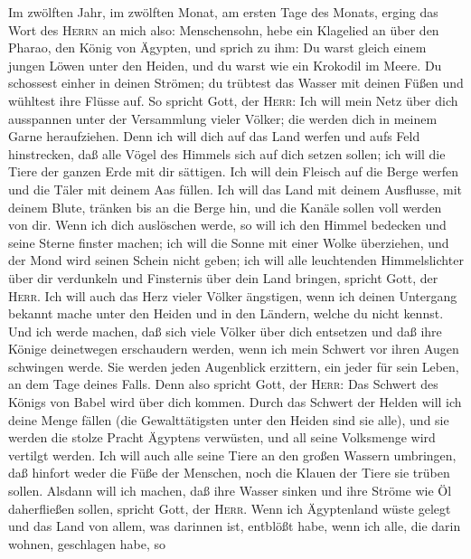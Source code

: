  Im zwölften Jahr, im zwölften Monat, am ersten Tage des
Monats, erging das Wort des \textsc{Herrn} an mich also: 
Menschensohn, hebe ein Klagelied an über den Pharao, den König von
Ägypten, und sprich zu ihm: Du warst gleich einem jungen Löwen unter den
Heiden, und du warst wie ein Krokodil im Meere. Du schossest einher in
deinen Strömen; du trübtest das Wasser mit deinen Füßen und wühltest
ihre Flüsse auf.  So spricht Gott, der \textsc{Herr}: Ich
will mein Netz über dich ausspannen unter der Versammlung vieler Völker;
die werden dich in meinem Garne heraufziehen.  Denn ich
will dich auf das Land werfen und aufs Feld hinstrecken, daß alle Vögel
des Himmels sich auf dich setzen sollen; ich will die Tiere der ganzen
Erde mit dir sättigen.  Ich will dein Fleisch auf die
Berge werfen und die Täler mit deinem Aas füllen.  Ich
will das Land mit deinem Ausflusse, mit deinem Blute, tränken bis an die
Berge hin, und die Kanäle sollen voll werden von dir. 
Wenn ich dich auslöschen werde, so will ich den Himmel bedecken und
seine Sterne finster machen; ich will die Sonne mit einer Wolke
überziehen, und der Mond wird seinen Schein nicht geben; 
ich will alle leuchtenden Himmelslichter über dir verdunkeln und
Finsternis über dein Land bringen, spricht Gott, der \textsc{Herr}.
 Ich will auch das Herz vieler Völker ängstigen, wenn ich
deinen Untergang bekannt mache unter den Heiden und in den Ländern,
welche du nicht kennst.  Und ich werde machen, daß sich
viele Völker über dich entsetzen und daß ihre Könige deinetwegen
erschaudern werden, wenn ich mein Schwert vor ihren Augen schwingen
werde. Sie werden jeden Augenblick erzittern, ein jeder für sein Leben,
an dem Tage deines Falls.  Denn also spricht Gott, der
\textsc{Herr}: Das Schwert des Königs von Babel wird über dich kommen.
 Durch das Schwert der Helden will ich deine Menge fällen
(die Gewalttätigsten unter den Heiden sind sie alle), und sie werden die
stolze Pracht Ägyptens verwüsten, und all seine Volksmenge wird vertilgt
werden.  Ich will auch alle seine Tiere an den großen
Wassern umbringen, daß hinfort weder die Füße der Menschen, noch die
Klauen der Tiere sie trüben sollen.  Alsdann will ich
machen, daß ihre Wasser sinken und ihre Ströme wie Öl daherfließen
sollen, spricht Gott, der \textsc{Herr}.  Wenn ich
Ägyptenland wüste gelegt und das Land von allem, was darinnen ist,
entblößt habe, wenn ich alle, die darin wohnen, geschlagen habe, so
